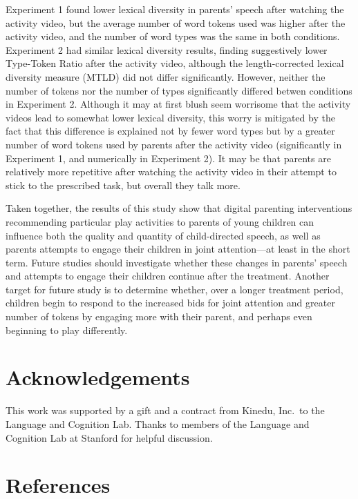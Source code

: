 \documentclass[man,floatsintext]{apa6}
\begin{document}
Experiment 1 found lower lexical diversity in parents' speech after watching the activity video, but the average number of word tokens used was higher after the activity video, and the number of word types was the same in both conditions.
Experiment 2 had similar lexical diversity results, finding suggestively lower Type-Token Ratio after the activity video, although the length-corrected lexical diversity measure (MTLD) did not differ significantly.
However, neither the number of tokens nor the number of types significantly differed betwen conditions in Experiment 2.
Although it may at first blush seem worrisome that the activity videos lead to somewhat lower lexical diversity, this worry is mitigated by the fact that this difference is explained not by fewer word types but by a greater number of word tokens used by parents after the activity video (significantly in Experiment 1, and numerically in Experiment 2).
It may be that parents are relatively more repetitive after watching the activity video in their attempt to stick to the prescribed task, but overall they talk more.

Taken together, the results of this study show that digital parenting interventions recommending particular play activities to parents of young children can influence both the quality and quantity of child-directed speech, as well as parents attempts to engage their children in joint attention---at least in the short term.
Future studies should investigate whether these changes in parents' speech and attempts to engage their children continue after the treatment.
Another target for future study is to determine whether, over a longer treatment period, children begin to respond to the increased bids for joint attention and greater number of tokens by engaging more with their parent, and perhaps even beginning to play differently.

\hypertarget{acknowledgements}{%
\section{Acknowledgements}\label{acknowledgements}}

This work was supported by a gift and a contract from Kinedu, Inc.~to the Language and Cognition Lab.
Thanks to members of the Language and Cognition Lab at Stanford for helpful discussion.

\newpage

\hypertarget{references}{%
\section{References}\label{references}}
\end{document}

